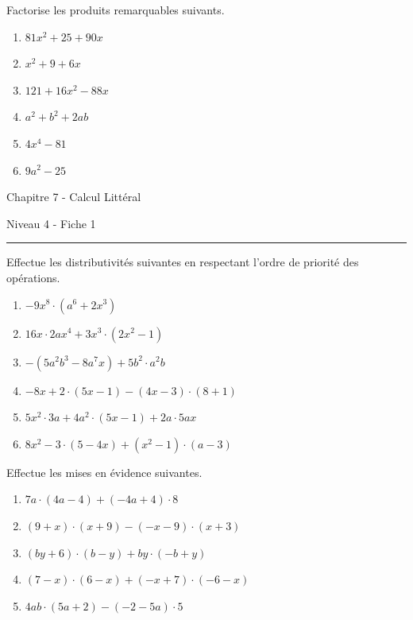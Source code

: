 \documentclass[12pt,parskip=half-, twoside=semi]{scrartcl}
\begin{document}
\begin{exercise}Factorise les produits remarquables suivants.
  \begin{enumerate}[cols=3]
    \item $81 x^2+25+90 x$
    \item $x^2+9+6 x$
    \item $121+16 x^2-88 x$
    \item $a^2+b^2+2 a b$
    \item $4 x^4-81$
    \item $9 a^2-25$
  \end{enumerate}
\end{exercise}


\begin{center}
  \bfseries
  \begin{Huge}
    Chapitre 7 - Calcul Littéral
  \end{Huge}
  \smallbreak
  \begin{large}
    Niveau 4  - Fiche 1
  \end{large}
  \smallbreak
  \rule[10pt]{.5\linewidth}{1 pt}
\end{center}
 
\setcounter{exercise}{0}

\begin{exercise}Effectue les distributivités suivantes en respectant l'ordre de priorité des opérations.
  \begin{enumerate} [cols=2]
      \item $-9 x^8 \cdot\left(a^6+2 x^3\right)$
      \item $16 x \cdot 2 a x^4+3 x^3 \cdot\left(2 x^2-1\right)$
      \item $-\left(5 a^2 b^3-8 a^7 x\right)+5 b^2 \cdot a^2 b$
      \item $-8 x+2 \cdot(5 x-1)-(4 x-3) \cdot(8+1)$
      \item $5 x^2 \cdot 3 a+4 a^2 \cdot(5 x-1)+2 a \cdot 5 a x$
      \item $8 x^2-3 \cdot(5-4 x)+\left(x^2-1\right) \cdot(a-3)$
  \end{enumerate}
\end{exercise}


\begin{exercise}Effectue les mises en évidence suivantes.
  \begin{enumerate}[cols=2]
      \item $7 a \cdot(4 a-4)+(-4 a+4) \cdot 8$
      \item $(9+x) \cdot(x+9)-(-x-9) \cdot(x+3)$
      \item $(b y+6) \cdot(b-y)+b y \cdot(-b+y)$
      \item $(7-x) \cdot(6-x)+(-x+7) \cdot(-6-x)$
      \item $4 a b \cdot(5 a+2)-(-2-5 a) \cdot 5$
  \end{enumerate}
\end{exercise}
\end{document}
